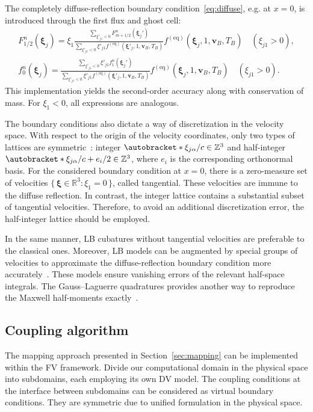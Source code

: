 \documentclass{elsarticle} %
\newcommand{\Set}[2]{\{\,{#1}:{#2}\,\}}
\DeclarePairedDelimiter\autobracket()       %
\newcommand{\br}[1]{\autobracket*{#1}}
\newcommand{\bxi}{\boldsymbol{\xi}}
\newcommand{\bv}{\boldsymbol{v}}
\newcommand{\equil}[1]{#1^\mathrm{(eq)}}
\newcommand{\xiai}{\xi_{j \alpha}}
\begin{document}
The completely diffuse-reflection boundary condition~\eqref{eq:diffuse}, e.g. at \(x=0\),
is introduced through the first flux and ghost cell:
\begin{gather}
    F_{1/2}^n(\bxi_j) = \displaystyle\xi_1\frac{\sum_{\xi'_{j1}<0}F_{m+1/2}^n(\bxi_j')}
        {\sum_{\xi'_{j1}<0}\xi'_{j1}\equil{f}(\bxi'_j,1,\bv_B,T_B)}
        \equil{f}(\bxi_j, 1, \bv_B, T_B) \quad (\xi_{j1}>0), \label{eq:first_flux}\\
    f_0^n(\bxi_j) = \displaystyle\frac{\sum_{\xi'_{j1}<0}\xi'_{j1}f_1^n(\bxi_j')}
        {\sum_{\xi'_{j1}<0}\xi'_{j1}\equil{f}(\bxi'_j,1,\bv_B,T_B)}
        \equil{f}(\bxi_j, 1, \bv_B, T_B) \quad (\xi_{j1}>0). \label{eq:first_ghost}
\end{gather}
This implementation yields the second-order accuracy along with conservation of mass.
For \(\xi_1<0\), all expressions are analogous.

The boundary conditions also dictate a way of discretization in the velocity space.
With respect to the origin of the velocity coordinates, only two types of lattices are symmetric~\cite{Inamuro1990}:
integer \(\br{\xiai/c} \in \mathbb{Z}^3\) and half-integer \(\br{\xiai/c + e_i/2} \in \mathbb{Z}^3\),
where \(e_i\) is the corresponding orthonormal basis.
For the considered boundary condition at \(x=0\), there is a zero-measure set of velocities
\(\Set{\bxi\in\mathbb{R}^3}{\xi_1=0}\), called tangential.
These velocities are immune to the diffuse reflection.
In contrast, the integer lattice contains a substantial subset of tangential velocities.
Therefore, to avoid an additional discretization error, the half-integer lattice should be employed.

In the same manner, LB cubatures without tangential velocities are preferable to the classical ones.
Moreover, LB models can be augmented by special groups of velocities to approximate
the diffuse-reflection boundary condition more accurately~\cite{Feuchter2016}.
These models ensure vanishing errors of the relevant half-space integrals.
The Gauss--Laguerre quadratures provides another way to reproduce the Maxwell half-moments exactly~\cite{Ambrus2014, Ambrus2016}.

\subsection{Coupling algorithm}\label{sec:numerics:coupling}

The mapping approach presented in Section~\ref{sec:mapping} can be implemented within the FV framework.
Divide our computational domain in the physical space into subdomains, each employing its own DV model.
The coupling conditions at the interface between subdomains can be considered as virtual boundary conditions.
They are symmetric due to unified formulation in the physical space.
\end{document}
